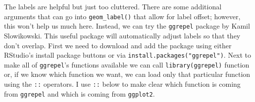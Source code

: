 \documentclass[
]{krantz}
\makeatletter
\newenvironment{Shaded}{\begin{snugshade}}{\end{snugshade}}
\newcommand{\CharTok}[1]{\textcolor[rgb]{0.5,0.5,0.5}{#1}}
\newcommand{\DataTypeTok}[1]{\textcolor[rgb]{0.27,0.27,0.27}{#1}}
\newcommand{\DecValTok}[1]{\textcolor[rgb]{0.06,0.06,0.06}{#1}}
\newcommand{\FloatTok}[1]{\textcolor[rgb]{0.06,0.06,0.06}{#1}}
\newcommand{\KeywordTok}[1]{\textcolor[rgb]{0.27,0.27,0.27}{\textbf{#1}}}
\newcommand{\NormalTok}[1]{#1}
\newcommand{\OperatorTok}[1]{\textcolor[rgb]{0.43,0.43,0.43}{\textbf{#1}}}
\newcommand{\StringTok}[1]{\textcolor[rgb]{0.5,0.5,0.5}{#1}}
\newenvironment{kframe}{%
\medskip{}
\setlength{\fboxsep}{.8em}
 \def\at@end@of@kframe{}%
 \ifinner\ifhmode%
  \def\at@end@of@kframe{\end{minipage}}%
  \begin{minipage}{\columnwidth}%
 \fi\fi%
 \def\FrameCommand##1{\hskip\@totalleftmargin \hskip-\fboxsep
 \colorbox{shadecolor}{##1}\hskip-\fboxsep
     \hskip-\linewidth \hskip-\@totalleftmargin \hskip\columnwidth}%
 \MakeFramed {\advance\hsize-\width
   \@totalleftmargin\z@ \linewidth\hsize
   \@setminipage}}%
 {\par\unskip\endMakeFramed%
 \at@end@of@kframe}
\renewenvironment{Shaded}{\begin{kframe}}{\end{kframe}}
\makeatother
\begin{document}
The labels are helpful but just too cluttered. There are some additional arguments that can go into \texttt{geom\_label()} that allow for label offset; however, this won't help us much here. Instead, we can try the \texttt{ggrepel} package by Kamil Slowikowski. This useful package will automatically adjust labels so that they don't overlap. First we need to download and add the package using either RStudio's install package buttons or via \texttt{install.packages("ggrepel")}. Next to make all of \texttt{ggrepel}'s functions available we can call \texttt{library(ggrepel)} function or, if we know which function we want, we can load only that particular function using the \texttt{::} operators. I use \texttt{::} below to make clear which function is coming from \texttt{ggrepel} and which is coming from \texttt{ggplot2}.

\begin{Shaded}
\end{Shaded}
\end{document}
